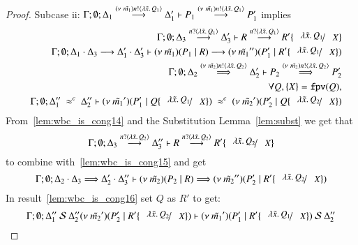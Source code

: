 \begin{proof}
	\noi Subcase ii:
	$\horel{\Gamma}{\Delta_1}{P_1}{\by{\news{\tilde{m_1}} \bactout{n}{\abs{\tilde{x}}{Q_1}}}}{\Delta_1'}{P_1'}$
	implies
%
	\begin{eqnarray}
		& & \horel{\Gamma}{\Delta_3}{R}{\by{\bactinp{n}{\abs{\tilde{x}} {Q_1}}}}{\Delta_3'}{R' \subst{\abs{\tilde{x}}{Q_1}}{X}}
		\label{lem:wbc_is_cong14}\\
		& & \horel{\Gamma}{\Delta_1 \cat \Delta_3}{\newsp{\tilde{m_1}}{P_1 \Par R}}{\by{}}{\Delta_1' \cat \Delta_3'}{\newsp{\tilde{m_1}''}{P_1' \Par R' \subst{\abs{\tilde{x}}{Q_1}}{X}}}
		\nonumber \\
		& & \horel{\Gamma}{\Delta_2}{P_2}{\By{\news{\tilde{m_2}} \bactout{n}{\abs{\tilde{x}}{Q_2}}}}{\Delta_2'}{P_2'}
		\label{lem:wbc_is_cong15}\\
		& & \forall Q, \set{X} = \fpv{Q}, \nonumber \\
		& & \horel{\Gamma}{\Delta_1''}{\newsp{\tilde{m_1}'}{P_1' \Par Q \subst{\abs{\tilde{x}}{Q_1}}{X}}}{\ \wbc\ }{\Delta_2''}{\newsp{\tilde{m_2}'}{P_2' \Par Q \subst{\abs{\tilde{x}}{Q_2}}{X}}}
		\label{lem:wbc_is_cong16}
	\end{eqnarray}
%
	From~\ref{lem:wbc_is_cong14} and the Substitution Lemma~\ref{lem:subst} we get that
	\[
		\horel{\Gamma}{\Delta_3}{R}{\by{\bactinp{n}{\abs{\tilde{x}} {Q_2}}}}{\Delta_3''}{R' \subst{\abs{\tilde{x}}{Q_2}}{X}}
	\]
	\noi to combine with~\ref{lem:wbc_is_cong15} and get
	\[
		\horel{\Gamma}{\Delta_2 \cat \Delta_3}{\newsp{\tilde{m_2}}{P_2 \Par R}}{\By{}}{\Delta_2' \cat \Delta_3''}{\newsp{\tilde{m_2}''}{P_2' \Par R' \subst{\abs{\tilde{x}}{Q_2}}{X}}}
	\]
%
	\noi In result~\ref{lem:wbc_is_cong16} set $Q$ as $R'$ to get:
%
	\[
		\horel{\Gamma}{\Delta_1''}{\newsp{\tilde{m_1}'}{P_1' \Par R' \subst{\abs{\tilde{x}}{Q_1}}{X}}}
		{\ \mathcal{S}\ \Delta_2''}
		{\newsp{\tilde{m_2}'}{P_2' \Par R' \subst{\abs{\tilde{x}}{Q_2}}{X}}}
	\]


\end{proof}
